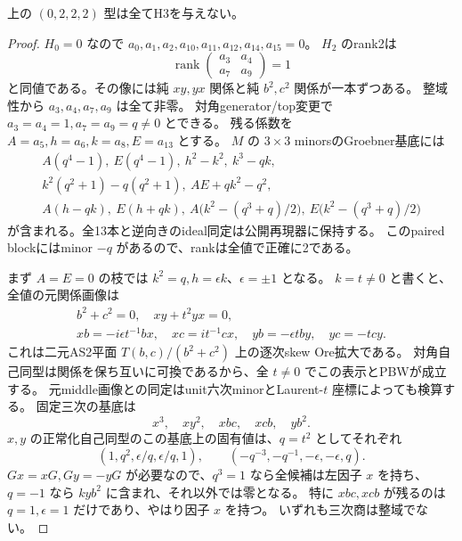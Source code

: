 \begin{theorem}[重み0関係が零の全rank型の排除]
\label{thm:cubic-four-simple-order4-rankC-empty}
上の $(0,2,2,2)$ 型は全てH3を与えない。
\end{theorem}
\begin{proof}
$H_0=0$ なので $a_0,a_1,a_2,a_{10},a_{11},a_{12},a_{14},a_{15}=0$。
$H_2$ のrank2は
\[
 \operatorname{rank}\begin{pmatrix}a_3&a_4\\a_7&a_9\end{pmatrix}=1
\]
と同値である。その像には純 $xy,yx$ 関係と純 $b^2,c^2$ 関係が一本ずつある。
整域性から $a_3,a_4,a_7,a_9$ は全て非零。
対角generator/top変更で $a_3=a_4=1,a_7=a_9=q\ne0$ とできる。
残る係数を $A=a_5,h=a_6,k=a_8,E=a_{13}$ とする。
$M$ の $3\times3$ minorsのGroebner基底には
\[
\begin{gathered}
 A(q^4-1),\ E(q^4-1),\ h^2-k^2,\ k^3-qk,\\
 k^2(q^2+1)-q(q^2+1),\ AE+qk^2-q^2,\\
 A(h-qk),\ E(h+qk),\
 A\bigl(k^2-(q^3+q)/2\bigr),\
 E\bigl(k^2-(q^3+q)/2\bigr)
\end{gathered}
\]
が含まれる。全13本と逆向きのideal同定は公開再現器に保持する。
このpaired blockにはminor $-q$ があるので、rankは全値で正確に2である。

まず $A=E=0$ の枝では $k^2=q,h=\epsilon k$、$\epsilon=\pm1$ となる。
$k=t\ne0$ と書くと、全値の元関係画像は
\begin{gather*}
 b^2+c^2=0,\quad xy+t^2yx=0,\\
 xb=-i\epsilon t^{-1}bx,\quad xc=it^{-1}cx,\quad
 yb=-\epsilon tby,\quad yc=-tcy.
\end{gather*}
これは二元AS2平面 $T(b,c)/(b^2+c^2)$ 上の逐次skew Ore拡大である。
対角自己同型は関係を保ち互いに可換であるから、全 $t\ne0$ でこの表示とPBWが成立する。
元middle画像との同定はunit六次minorとLaurent-$t$ 座標によっても検算する。
固定三次の基底は
\[
 x^3,\quad xy^2,\quad xbc,\quad xcb,\quad yb^2.
\]
$x,y$ の正常化自己同型のこの基底上の固有値は、$q=t^2$ としてそれぞれ
\[
 (1,q^2,\epsilon/q,\epsilon/q,1),\qquad
 (-q^{-3},-q^{-1},-\epsilon,-\epsilon,q).
\]
$Gx=xG,Gy=-yG$ が必要なので、$q^3=1$ なら全候補は左因子 $x$ を持ち、
$q=-1$ なら $kyb^2$ に含まれ、それ以外では零となる。
特に $xbc,xcb$ が残るのは $q=1,\epsilon=1$ だけであり、やはり因子 $x$ を持つ。
いずれも三次商は整域でない。


\end{proof}
